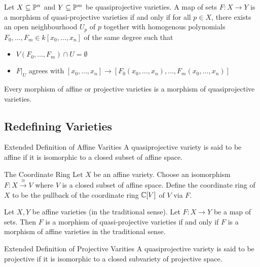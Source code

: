 \documentclass[a4paper]{article}
\begin{document}
\begin{prp}{}{} Let $X\subseteq\mathbb{P}^n$ and $Y\subseteq\mathbb{P}^m$ be quasiprojective varieties. A map of sets $F:X\to Y$ is a morphism of quasi-projective varieties if and only if for all $p\in X$, there exists an open neighbourhood $U_p$ of $p$ together with homogenous polynomials $F_0,\dots,F_m\in k[x_0,\dots,x_n]$ of the same degree such that 
\begin{itemize}
\item $V(F_0,\dots,F_m)\cap U=\emptyset$
\item $F|_U$ agrees with $[x_0,\dots,x_n]\to[F_0(x_0,\dots,x_n),\dots,F_m(x_0,\dots,x_n)]$
\end{itemize}
\end{prp}

\begin{lmm}{}{} Every morphism of affine or projective varieties is a morphism of quasiprojective varieties. 
\end{lmm}

\subsection{Redefining Varieties}
\begin{defn}{Extended Definition of Affine Varities}{} A quasiprojective variety is said to be affine if it is isomorphic to a closed subset of affine space. 
\end{defn}

\begin{defn}{The Coordinate Ring}{} Let $X$ be an affine variety. Choose an isomorphism $F:X\overset{\cong}{\longrightarrow}V$ where $V$ is a closed subset of affine space. Define the coordinate ring of $X$ to be the pullback of the coordinate ring $\mathbb{C}[V]$ of $V$ via $F$. 
\end{defn}

\begin{prp}{}{} Let $X,Y$ be affine varieties (in the traditional sense). Let $F:X\to Y$ be a map of sets. Then $F$ is a morphism of quasi-projective varieties if and only if $F$ is a morphism of affine varieties in the traditional sense. 
\end{prp}

\begin{defn}{Extended Definition of Projective Varities}{} A quasiprojective variety is said to be projective if it is isomorphic to a closed subvariety of projective space. 
\end{defn}
\end{document}

